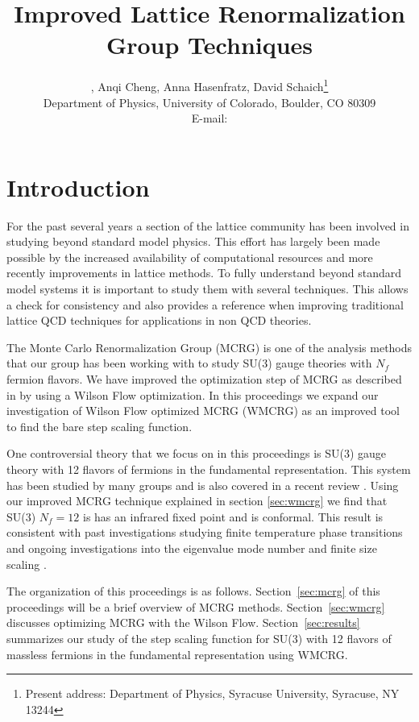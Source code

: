 \documentclass{PoS}
\title{Improved Lattice Renormalization Group Techniques}
\author{\speaker{Gregory Petropoulos}, Anqi Cheng, Anna Hasenfratz, David Schaich\footnote{Present address: Department of Physics, Syracuse University, Syracuse, NY 13244} \\
        Department of Physics, University of Colorado, Boulder, CO 80309 \\
        E-mail: \email{gregory.petropoulos@colorado.edu}}
\newcommand{\secref}[1]{Section~\ref{#1}}
\begin{document}
\section{Introduction}
For the past several years a section of the lattice community has been involved in studying beyond standard model physics.
This effort has largely been made possible by the increased availability of computational resources and more recently improvements in lattice methods.
To fully understand beyond standard model systems it is important to study them with several techniques.
This allows a check for consistency and also provides a reference when improving traditional lattice QCD techniques for applications in non QCD theories.

The Monte Carlo Renormalization Group (MCRG) is one of the analysis methods that our group has been working with to study SU(3) gauge theories with $N_f$ fermion flavors.
We have improved the optimization step of MCRG as described in \cite{Petropoulos:2012Lat12} by using a Wilson Flow optimization.
In this proceedings we expand our investigation of Wilson Flow optimized MCRG (WMCRG) as an improved tool to find the bare step scaling function.

One controversial theory that we focus on in this proceedings is SU(3) gauge theory with 12 flavors of fermions in the fundamental representation.
This system has been studied by many groups \cite{Appelquist:2009ty, Deuzeman:2009mh, Hasenfratz:2011xn, Fodor:2011tu, DeGrand:2011cu, Cheng:2011ic, Cheng:2013eu, Fodor:2012uw, Fodor:2012et, Appelquist:2011dp, Aoki:2012eq, Aoki:2013pca, Itou:2012qn, Lin:2012iw, Jin:2012dw} and is also covered in a recent review \cite{Giedt:2012LAT}.
Using our improved MCRG technique explained in section \ref{sec:wmcrg} we find that SU(3) $N_f=12$ is has an infrared fixed point and is conformal.
This result is consistent with past investigations studying finite temperature phase transitions \cite{Schaich:2012fr} and ongoing investigations into the eigenvalue mode number \cite{} and finite size scaling \cite{Hasenfratz:2013eka}.

The organization of this proceedings is as follows.
\secref{sec:mcrg} of this proceedings will be a brief overview of MCRG methods.
\secref{sec:wmcrg} discusses optimizing MCRG with the Wilson Flow.
\secref{sec:results} summarizes our study of the step scaling function for SU(3) with 12 flavors of massless fermions in the fundamental representation using WMCRG.
\end{document}
